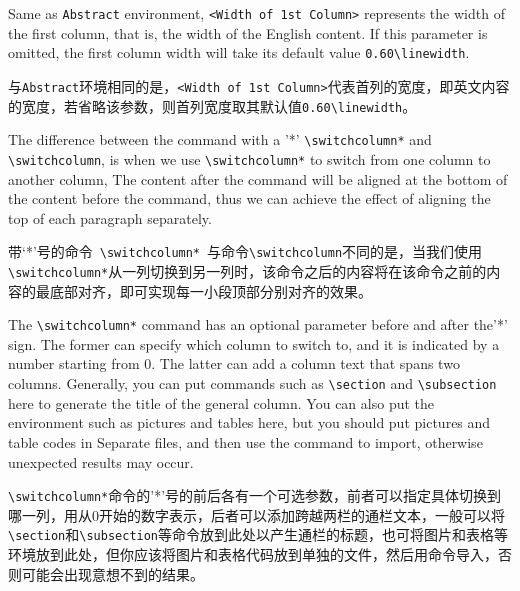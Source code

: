 \begin{ParaColumn}
    Same as \verb"Abstract" environment, \verb"<Width of 1st Column>" represents the width of the first column, that is, the width of the English content. If this parameter is omitted, the first column width will take its default value \verb"0.60\linewidth".

    \switchcolumn

    与\verb"Abstract"环境相同的是，\verb"<Width of 1st Column>"代表首列的宽度，即英文内容的宽度，若省略该参数，则首列宽度取其默认值\verb"0.60\linewidth"。

    \switchcolumn*

    The difference between the command with a '*' \verb"\switchcolumn*" and \verb"\switchcolumn", is when we use \verb"\switchcolumn*" to switch from one column to another column, The content after the command will be aligned at the bottom of the content before the command, thus we can achieve the effect of aligning the top of each paragraph separately.

    \switchcolumn

    带‘*’号的命令~\verb"\switchcolumn*"~与命令\verb"\switchcolumn"不同的是，当我们使用\verb"\switchcolumn*"从一列切换到另一列时，该命令之后的内容将在该命令之前的内容的最底部对齐，即可实现每一小段顶部分别对齐的效果。

    \switchcolumn*

    The \verb"\switchcolumn*" command has an optional parameter before and after the'*' sign. The former can specify which column to switch to, and it is indicated by a number starting from 0. The latter can add a column text that spans two columns.  Generally, you can put commands such as \verb"\section" and \verb"\subsection" here to generate the title of the general column. You can also put the environment such as pictures and tables here, but you should put pictures and table codes in  Separate files, and then use the \verb"" command to import, otherwise unexpected results may occur.

    \switchcolumn

    \verb"\switchcolumn*"命令的'*'号的前后各有一个可选参数，前者可以指定具体切换到哪一列，用从0开始的数字表示，后者可以添加跨越两栏的通栏文本，一般可以将\verb"\section"和\verb"\subsection"等命令放到此处以产生通栏的标题，也可将图片和表格等环境放到此处，但你应该将图片和表格代码放到单独的文件，然后用\verb""命令导入，否则可能会出现意想不到的结果。


\end{ParaColumn}
